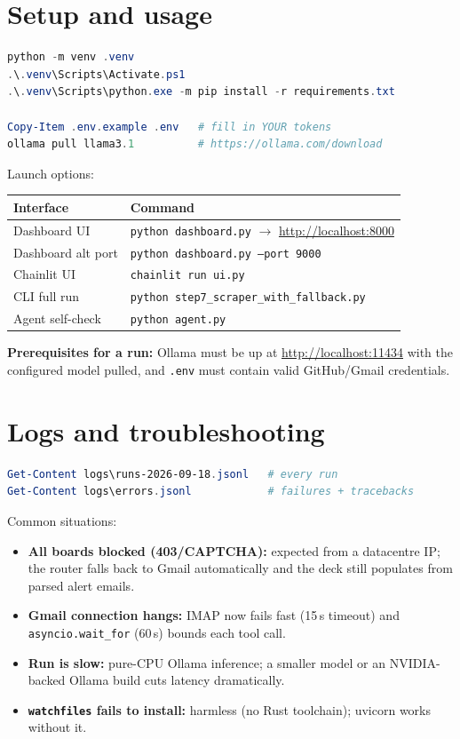 \documentclass[11pt,a4paper]{article}
\newcommand{\file}[1]{\texttt{\small #1}}
\newcommand{\tool}[1]{\texttt{#1}}
\newcommand{\link}[1]{\url{#1}}
\begin{document}
\section{Setup and usage}
\label{sec:usage}

\begin{lstlisting}[language=PowerShell, numbers=none]
python -m venv .venv
.\.venv\Scripts\Activate.ps1
.\.venv\Scripts\python.exe -m pip install -r requirements.txt

Copy-Item .env.example .env   # fill in YOUR tokens
ollama pull llama3.1          # https://ollama.com/download
\end{lstlisting}

Launch options:
\begin{center}
\begin{tabular}{@{}ll@{}}
\toprule
\textbf{Interface} & \textbf{Command}\\
\midrule
Dashboard UI & \file{python dashboard.py} $\rightarrow$ \link{http://localhost:8000}\\
Dashboard alt port & \file{python dashboard.py --port 9000}\\
Chainlit UI & \file{chainlit run ui.py}\\
CLI full run & \file{python step7\_scraper\_with\_fallback.py}\\
Agent self-check & \file{python agent.py}\\
\bottomrule
\end{tabular}
\end{center}

\textbf{Prerequisites for a run:} Ollama must be up at
\link{http://localhost:11434} with the configured model pulled, and
\file{.env} must contain valid GitHub/Gmail credentials.

\section{Logs and troubleshooting}
\label{sec:troubleshoot}

\begin{lstlisting}[language=PowerShell, numbers=none]
Get-Content logs\runs-2026-09-18.jsonl   # every run
Get-Content logs\errors.jsonl            # failures + tracebacks
\end{lstlisting}

Common situations:
\begin{itemize}
  \item \textbf{All boards blocked (403/CAPTCHA):} expected from a datacentre
        IP; the router falls back to Gmail automatically and the deck still
        populates from parsed alert emails.
  \item \textbf{Gmail connection hangs:} IMAP now fails fast (15\,s timeout)
        and \tool{asyncio.wait\_for} (60\,s) bounds each tool call.
  \item \textbf{Run is slow:} pure-CPU Ollama inference; a smaller model or an
        NVIDIA-backed Ollama build cuts latency dramatically.
  \item \textbf{\file{watchfiles} fails to install:} harmless (no Rust
        toolchain); uvicorn works without it.
\end{itemize}
\end{document}
